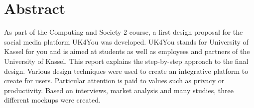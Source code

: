 \section*{Abstract}
As part of the Computing and Society 2 course, a first design proposal for the social media platform UK4You was developed.
UK4You stands for \glqq University of Kassel for you\grqq{} and is aimed at students as well as employees and partners of the University of Kassel.
This report explains the step-by-step approach to the final design.
Various design techniques were used to create an integrative platform to create for users.
Particular attention is paid to values such as privacy or productivity.
Based on interviews, market analysis and many studies, three different mockups were created.